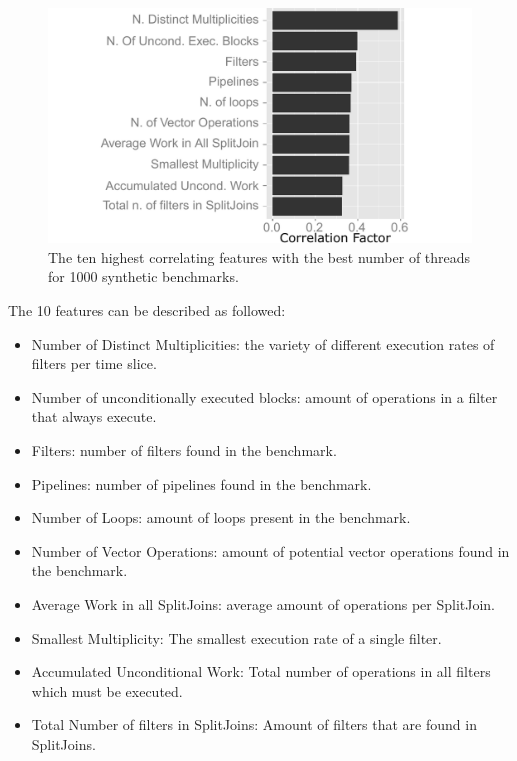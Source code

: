 \begin{figure} 
  \centering
 \includegraphics[width=1\textwidth]{streamit-paper/graphics/corrThreadRemix.pdf}
  \caption{The ten highest correlating features with the best number of threads for 1000 synthetic benchmarks.}\label{fig:corr}
\end{figure}
 
The 10 features can be described as followed:
\begin{itemize}
\item Number of Distinct Multiplicities: the variety of different execution rates of filters per time slice.
\vspace{-1em}
\item Number of unconditionally executed blocks: amount of operations in a filter that always execute.
\vspace{-1em}
\item Filters: number of filters found in the benchmark.
\vspace{-1em}
\item Pipelines: number of pipelines found in the benchmark.
\vspace{-1em}
\item Number of Loops: amount of loops present in the benchmark.
\vspace{-1em}
\item Number of Vector Operations: amount of potential vector operations found in the benchmark.
\vspace{-1em}
\item Average Work in all SplitJoins: average amount of operations per SplitJoin.
\vspace{-1em}
\item Smallest Multiplicity: The smallest execution rate of a single filter.
\vspace{-1em}
\item Accumulated Unconditional Work: Total number of operations in all filters which must be executed.
\vspace{-1em}
\item Total Number of filters in SplitJoins: Amount of filters that are found in SplitJoins.
\end{itemize}

